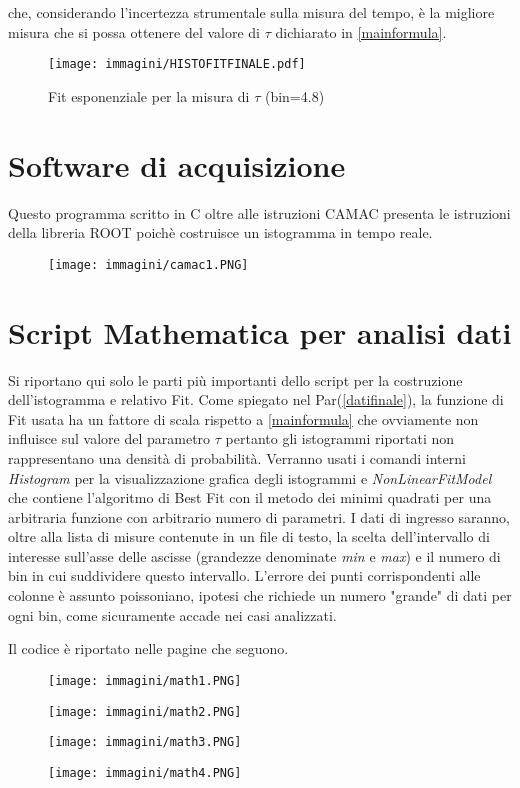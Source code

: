 \documentclass[12pt,a4paper,openright,twoside]{article}
\numberwithin{equation}{section} %
\begin{document}
che, considerando l'incertezza strumentale sulla misura del tempo, è la migliore misura che si possa ottenere del valore di $\tau$ dichiarato in \ref{mainformula}.


\begin{figure}[hbtp]
\centering
\texttt{[image: immagini/HISTOFITFINALE.pdf]}
\caption{Fit esponenziale per la misura di $\tau$ (bin=4.8)}
\label{istofitfinale}
\end{figure}


\newpage

\appendix 
\section{Software di acquisizione} \label{Acamac}
Questo programma scritto in C oltre alle istruzioni CAMAC presenta le istruzioni della libreria ROOT poichè costruisce un istogramma in tempo reale.


\begin{figure}[hbtp]
\centering
\texttt{[image: immagini/camac1.PNG]}
\end{figure}

\pagebreak
\section{Script Mathematica per analisi dati} \label{Amath}

Si riportano qui solo le parti più importanti dello script per la costruzione dell'istogramma e relativo Fit.
Come spiegato nel Par(\ref{datifinale}), la funzione di Fit usata ha un fattore di scala rispetto a \ref{mainformula} che ovviamente non influisce sul valore del parametro $\tau$ pertanto gli istogrammi riportati non rappresentano una densità di probabilità.
Verranno usati i comandi interni \textit{Histogram} per la visualizzazione grafica degli istogrammi e \textit{NonLinearFitModel} che contiene l'algoritmo di Best Fit con il metodo dei minimi quadrati per una arbitraria funzione con arbitrario numero di parametri.
I dati di ingresso saranno, oltre alla lista di misure contenute in un file di testo, la scelta dell'intervallo di interesse sull'asse delle ascisse (grandezze denominate \textit{min} e \textit{max}) e il numero di bin in cui suddividere questo intervallo.
L'errore dei punti corrispondenti alle colonne è assunto poissoniano, ipotesi che richiede un numero "grande" di dati per ogni bin, come sicuramente accade nei casi analizzati.

Il codice è riportato nelle pagine che seguono.

\begin{figure}[hbtp]
\centering
\texttt{[image: immagini/math1.PNG]}
\end{figure}
\begin{figure}[hbtp]
\centering
\texttt{[image: immagini/math2.PNG]}
\end{figure}
\begin{figure}[hbtp]
\centering
\texttt{[image: immagini/math3.PNG]}
\end{figure}
\begin{figure}[hbtp]
\centering
\texttt{[image: immagini/math4.PNG]}
\end{figure}
\end{document}
